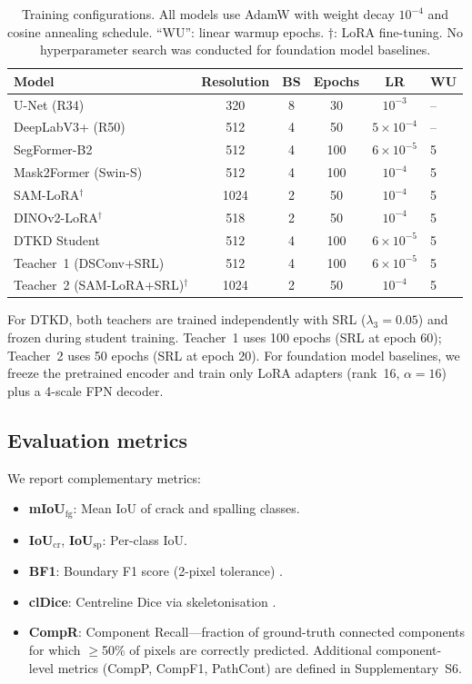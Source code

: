 \documentclass[review,authoryear]{elsarticle}
\begin{document}
\begin{table}[t]
\centering
\caption{Training configurations. All models use AdamW with weight decay $10^{-4}$ and cosine annealing schedule. ``WU'': linear warmup epochs. $\dagger$: LoRA fine-tuning. No hyperparameter search was conducted for foundation model baselines.}
\label{tab:training_config}
\setlength{\tabcolsep}{4pt}
\begin{tabular}{lccccl}
\toprule
Model & Resolution & BS & Epochs & LR & WU \\
\midrule
U-Net (R34) & 320 & 8 & 30 & $10^{-3}$ & -- \\
DeepLabV3+ (R50) & 512 & 4 & 50 & $5{\times}10^{-4}$ & -- \\
SegFormer-B2 & 512 & 4 & 100 & $6{\times}10^{-5}$ & 5 \\
Mask2Former (Swin-S) & 512 & 4 & 100 & $10^{-4}$ & 5 \\
SAM-LoRA$^\dagger$ & 1024 & 2 & 50 & $10^{-4}$ & 5 \\
DINOv2-LoRA$^\dagger$ & 518 & 2 & 50 & $10^{-4}$ & 5 \\
\midrule
DTKD Student & 512 & 4 & 100 & $6{\times}10^{-5}$ & 5 \\
Teacher~1 (DSConv+SRL) & 512 & 4 & 100 & $6{\times}10^{-5}$ & 5 \\
Teacher~2 (SAM-LoRA+SRL)$^\dagger$ & 1024 & 2 & 50 & $10^{-4}$ & 5 \\
\bottomrule
\end{tabular}
\end{table}

For DTKD, both teachers are trained independently with SRL ($\lambda_3 = 0.05$) and frozen during student training. Teacher~1 uses 100 epochs (SRL at epoch 60); Teacher~2 uses 50 epochs (SRL at epoch 20).
For foundation model baselines, we freeze the pretrained encoder and train only LoRA adapters (rank~16, $\alpha{=}16$) plus a 4-scale FPN decoder.

\subsection{Evaluation metrics}

We report complementary metrics:
\begin{itemize}[nosep]
    \item \textbf{mIoU$_{\text{fg}}$}: Mean IoU of crack and spalling classes.
    \item \textbf{IoU$_{\text{cr}}$}, \textbf{IoU$_{\text{sp}}$}: Per-class IoU.
    \item \textbf{BF1}: Boundary F1 score (2-pixel tolerance) \citep{csurka2013good}.
    \item \textbf{clDice}: Centreline Dice via skeletonisation \citep{shit2021cldice}.
    \item \textbf{CompR}: Component Recall---fraction of ground-truth connected components for which $\geq$50\% of pixels are correctly predicted. Additional component-level metrics (CompP, CompF1, PathCont) are defined in Supplementary~S6.
\end{itemize}
\end{document}
